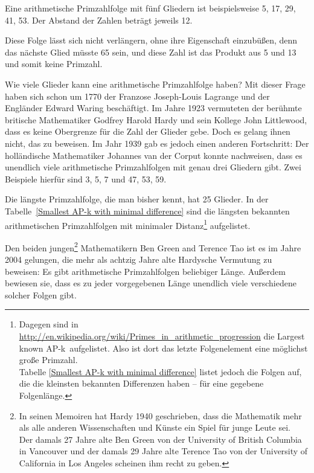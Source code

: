 \begin{refsegment}
\begin{itemize}
     Eine arithmetische Primzahlfolge mit fünf Gliedern ist beispielsweise
     5, 17, 29, 41, 53. Der Abstand der Zahlen beträgt jeweils 12.

     Diese Folge lässt sich nicht verlängern, ohne ihre Eigenschaft
     einzubüßen, denn das nächste Glied müsste 65 sein, und diese Zahl ist
     das Produkt aus 5 und 13 und somit keine Primzahl.

     Wie viele Glieder kann eine arithmetische Primzahlfolge haben? Mit dieser
     Frage haben sich schon um 1770 der Franzose Joseph-Louis Lagrange und der
     Engländer Edward Waring beschäftigt. Im Jahre 1923 vermuteten der
     berühmte britische Mathematiker Godfrey Harold Hardy und sein Kollege
     John Littlewood, dass es keine Obergrenze für die Zahl der Glieder gebe.
     Doch es gelang ihnen nicht, das zu beweisen. Im Jahr 1939 gab es jedoch
     einen anderen Fortschritt: Der holländische Mathematiker Johannes van der
     Corput konnte nachweisen, dass es unendlich viele arithmetische
     Primzahlfolgen mit genau drei Gliedern gibt. Zwei Beispiele hierfür sind
     3, 5, 7  und  47, 53, 59.

     Die längste Primzahlfolge, die man bisher kennt, hat 25 Glieder.
     In der Tabelle~\ref{Smallest AP-k with minimal difference}
     sind die längsten bekannten arithmetischen
     Primzahlfolgen mit minimaler Distanz\footnote{%
        Dagegen sind in
        \url{http://en.wikipedia.org/wiki/Primes_in_arithmetic_progression}
        die \glqq Largest known AP-k\grqq~aufgelistet.
        Also ist dort das letzte Folgenelement eine möglichst große Primzahl.\\
        Tabelle \ref{Smallest AP-k with minimal difference} listet jedoch die
	Folgen auf, die die kleinsten bekannten Differenzen haben -- für eine
	gegebene Folgenlänge.
     }
     aufgelistet.

     Den beiden jungen\footnote{%
     In seinen Memoiren hat Hardy 1940 geschrieben,
     dass die Mathematik mehr als alle anderen Wissenschaften und Künste
     ein Spiel für junge Leute sei. \\
     Der damals 27 Jahre alte Ben Green von der University of British Columbia
     in Vancouver und der damals 29 Jahre alte Terence Tao von der
     University of California in Los Angeles scheinen ihm recht zu geben.
     }
     Mathematikern  Ben Green and Terence Tao ist es im Jahre 2004 gelungen,
     die mehr als achtzig Jahre alte Hardysche Vermutung zu beweisen:
     Es gibt arithmetische Primzahlfolgen beliebiger Länge. Außerdem bewiesen
     sie, dass es zu jeder vorgegebenen Länge unendlich viele verschiedene
     solcher Folgen gibt.


\end{itemize}
\end{refsegment}
